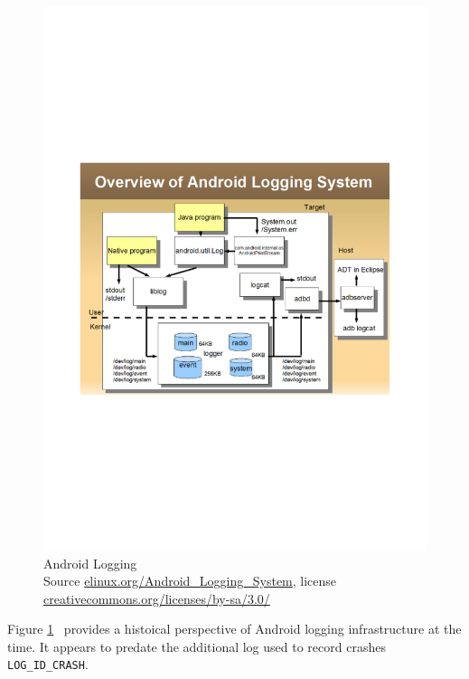 \begin{figure}
    \includegraphics[width=\linewidth]{images/elinux.org/Android-logging-kmc-kobayashi.pdf}
    \caption[Android Logging]{Android Logging\\Source \href{https://elinux.org/Android_Logging_System}{elinux.org/Android\_Logging\_System}, license \href{https://creativecommons.org/licenses/by-sa/3.0/}{creativecommons.org/licenses/by-sa/3.0/}}
    \label{fig:android_logging_circa_2010}
\end{figure}

Figure \ref{fig:android_logging_circa_2010}~ 
provides a histoical perspective of Android logging infrastructure at the time. It appears to predate the additional log used to record crashes \texttt{LOG\_ID\_CRASH}.


